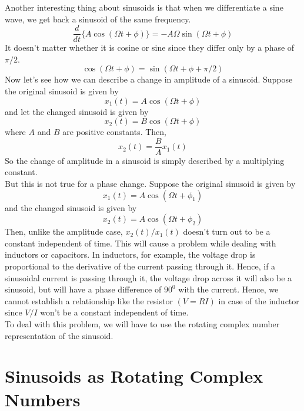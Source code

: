 Another interesting thing about sinusoids is that when we differentiate a
sine wave, we get back a sinusoid of the same frequency.
\begin{equation*}
\frac{d}{d t}  \{ A \cos (\Omega t + \phi) \} = - A \Omega \sin
   (\Omega t + \phi)
\end{equation*}
It doesn't matter whether it is cosine or sine since they differ only by a
phase of $\pi / 2$.
\[ \cos (\Omega t + \phi) = \sin (\Omega t + \phi + \pi / 2) \]
Now let's see how we can describe a change in amplitude of a sinusoid.
Suppose the original sinusoid is given by
\[ x_1 (t) = A \cos (\Omega t + \phi) \]
and let the changed sinusoid is given by
\[ x_2 (t) = B \cos (\Omega t + \phi) \]
where $A$ and $B$ are positive constants. Then,
\[ x_2 (t) = \frac{B}{A} x_1 (t) \]
So the change of amplitude in a sinusoid is simply described by a multiplying
constant.\\
But this is not true for a phase change. Suppose the original sinusoid is
given by
\[ x_1 (t) = A \cos (\Omega t + \phi_1) \]
and the changed sinusoid is given by
\[ x_2 (t) = A \cos (\Omega t + \phi_2) \]
Then, unlike the amplitude case, $x_2 (t) / x_1 (t)$ doesn't turn out to be a
constant independent of time. This will cause a problem while dealing with
inductors or capacitors. In inductors, for example, the voltage drop is
proportional to the derivative of the current passing through it. Hence, if a
sinusoidal current is passing through it, the voltage drop across it will also
be a sinusoid, but will have a phase difference of $90^0$ with the current.
Hence, we cannot establish a relationship like the resistor $(V = RI)$ in case
of the inductor since $V / I$ won't be a constant independent of time.\\
To deal with this problem, we will have to use the rotating complex number
representation of the sinusoid.

\section{Sinusoids as Rotating Complex Numbers}

